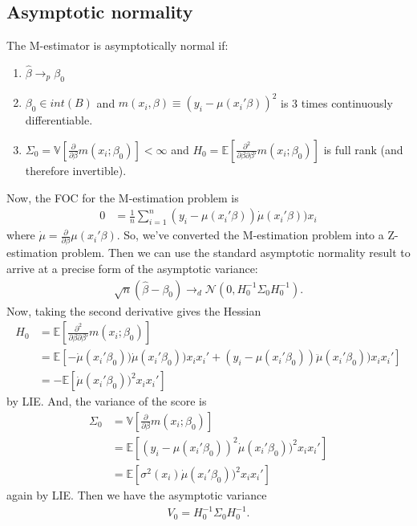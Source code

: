 \documentclass[12pt]{article}
\newcommand{\E}{\mathbb{E}}
\newcommand{\V}{\mathbb{V}}
\newcommand{\mtx}[1]{\ensuremath{\bm{\mathit{#1}}}}
\newcommand{\N}{\mathcal{N}}
\begin{document}
\subsection{Asymptotic normality}
The M-estimator is asymptotically normal if:
\begin{enumerate}
\item $\hat{\mtx{\beta}} \to_p \mtx{\beta}_0$
\item $\mtx{\beta}_0 \in int(B)$ and $m(\mtx{x}_i,\mtx{\beta}) \equiv (y_i - \mu(\mtx{x}_i'\mtx{\beta}))^2$ is 3 times continuously differentiable.
\item $\Sigma_0 = \V[\frac{\partial}{\partial \beta} m(\mtx{x}_i; \beta_0)] < \infty$ and $H_0 = \E[\frac{\partial^2}{\partial \beta \partial \beta'} m(\mtx{x}_i; \beta_0)]$ is full rank (and therefore invertible).
\end{enumerate}
Now, the FOC for the M-estimation problem is
\begin{align}
0 &= \frac{1}{n} \sum_{i=1}^n (y_i-\mu(\mtx{x}_i'\mtx{\beta}))\dot{\mu}(\mtx{x}_i'\mtx{\beta}))\mtx{x}_i \label{eq:M1}
\end{align}
where $\dot \mu = \frac{\partial}{\partial \beta}  \mu (\mtx{x}_i'\mtx{\beta})$. So, we've converted the M-estimation problem into a Z-estimation problem. Then we can use the standard asymptotic normality result to arrive at a precise form of the asymptotic variance:
\begin{align*}
\sqrt{n}(\hat{\mtx{\beta}}-\mtx{\beta}_0) \to_d \N(0, H_0^{-1}\Sigma_0 H_0^{-1}).
\end{align*}
Now, taking the second derivative gives the Hessian
\begin{align*}
H_0 &= \E[\frac{\partial^2}{\partial \beta \partial \beta'} m(\mtx{x}_i; \beta_0)]\\
&=\E\left[-\dot{\mu}(\mtx{x}_i'\mtx{\beta}_0))\dot{\mu}(\mtx{x}_i'\mtx{\beta}_0))\mtx{x}_i\mtx{x}_i' + (y_i-\mu(\mtx{x}_i'\mtx{\beta}_0))\ddot{\mu}(\mtx{x}_i'\mtx{\beta}_0))\mtx{x}_i\mtx{x}_i'\right]\\
&=-\E[\dot{\mu}(\mtx{x}_i'\mtx{\beta}_0))^2\mtx{x}_i\mtx{x}_i']
\end{align*}
by LIE. And, the variance of the score is
\begin{align*}
\Sigma_0 &= \V[\frac{\partial}{\partial \beta} m(\mtx{x}_i; \beta_0)] \\
&=\E\left[(y_i-\mu(\mtx{x}_i'\mtx{\beta}_0))^2\dot{\mu}(\mtx{x}_i'\mtx{\beta}_0))^2\mtx{x}_i\mtx{x}_i'\right]\\
&=\E[\sigma^2(\mtx{x}_i)\dot{\mu}(\mtx{x}_i'\mtx{\beta}_0))^2\mtx{x}_i\mtx{x}_i']
\end{align*}
again by LIE. Then we have the asymptotic variance
\begin{align*}
\mtx{V}_0 = H_0^{-1}\Sigma_0 H_0^{-1}.
\end{align*}
\end{document}
